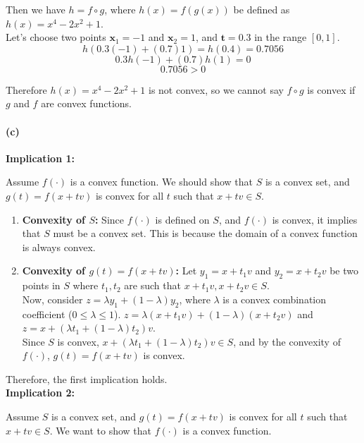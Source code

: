 \documentclass[12pt]{article}
\begin{document}
Then we have \( h = f \circ g \), where \( h(x) = f(g(x)) \) be defined as \( h(x) = x^4-2x^2+1 \). \\

Let's choose two points $\mathbf{x}_1 = -1$ and $\mathbf{x}_2 = 1$, and $\mathbf{t} = 0.3$ in the range $[0, 1]$. \\
\[
    h(0.3(-1) + (0.7)1) = h(0.4) = 0.7056
\]
\[
    0.3h(-1) + (0.7)h(1) = 0
\]
\[
    0.7056 > 0
\]


Therefore \( h(x) = x^4-2x^2+1 \) is not convex, so we cannot say \( f \circ g \) is convex if \( g \) and \( f \) are convex functions.
\paragraph{(c)}

\textbf{Implication 1:}

Assume \( f(·) \) is a convex function. We should show that \( S \) is a convex set, and \( g(t) = f(x + tv) \) is convex for all \( t \) such that \( x + tv \in S \).

\begin{enumerate}
    \item \textbf{Convexity of \( S \):} Since \( f(·) \) is defined on \( S \), and \( f(·) \) is convex, it implies that \( S \) must be a convex set. This is because the domain of a convex function is always convex.
    
    \item \textbf{Convexity of \( g(t) = f(x + tv) \):} Let \( y_1 = x + t_1v \) and \( y_2 = x + t_2v \) be two points in \( S \) where \( t_1, t_2 \) are such that \( x + t_1v, x + t_2v \in S \). \\
    Now, consider \( z = \lambda y_1 + (1 - \lambda) y_2 \), where \( \lambda \) is a convex combination coefficient (\( 0 \leq \lambda \leq 1 \)). \( z = \lambda (x + t_1v) + (1 - \lambda)(x + t_2v) \) and \( z = x + (\lambda t_1 + (1 - \lambda)t_2)v \). \\
    Since \( S \) is convex, \( x + (\lambda t_1 + (1 - \lambda)t_2)v \in S \), and by the convexity of \( f(·) \), \( g(t) = f(x + tv) \) is convex.
\end{enumerate}

Therefore, the first implication holds. \\

\textbf{Implication 2:}

Assume \( S \) is a convex set, and \( g(t) = f(x + tv) \) is convex for all \( t \) such that \( x + tv \in S \). We want to show that \( f(·) \) is a convex function.
\end{document}
